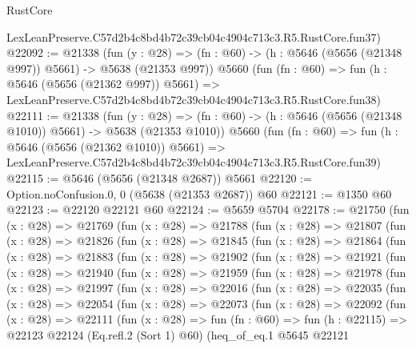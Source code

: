 \begin{lexlean}{RustCore}
\begin{coremodule}
    LexLeanPreserve.C57d2b4c8bd4b72c39cb04c4904c713c3.R5.RustCore.fun37)
@22092 := @21338
    (fun (y : @28) => (fn : @60) -> (h : @5646 (@5656 (@21348 @997)) @5661) -> @5638 (@21353 @997))
    @5660
    (fun (fn : @60) =>
    fun (h : @5646 (@5656 (@21362 @997)) @5661) =>
    LexLeanPreserve.C57d2b4c8bd4b72c39cb04c4904c713c3.R5.RustCore.fun38)
@22111 := @21338
    (fun (y : @28) =>
    (fn : @60) -> (h : @5646 (@5656 (@21348 @1010)) @5661) -> @5638 (@21353 @1010))
    @5660
    (fun (fn : @60) =>
    fun (h : @5646 (@5656 (@21362 @1010)) @5661) =>
    LexLeanPreserve.C57d2b4c8bd4b72c39cb04c4904c713c3.R5.RustCore.fun39)
@22115 := @5646 (@5656 (@21348 @2687)) @5661
@22120 := Option.noConfusion.{0, 0} (@5638 (@21353 @2687)) @60
@22121 := @1350 @60
@22123 := @22120 @22121 @60
@22124 := @5659 @5704
@22178 := @21750
    (fun (x : @28) =>
    @21769
      (fun (x : @28) =>
      @21788
        (fun (x : @28) =>
        @21807
          (fun (x : @28) =>
          @21826
            (fun (x : @28) =>
            @21845
              (fun (x : @28) =>
              @21864
                (fun (x : @28) =>
                @21883
                  (fun (x : @28) =>
                  @21902
                    (fun (x : @28) =>
                    @21921
                      (fun (x : @28) =>
                      @21940
                        (fun (x : @28) =>
                        @21959
                          (fun (x : @28) =>
                          @21978
                            (fun (x : @28) =>
                            @21997
                              (fun (x : @28) =>
                              @22016
                                (fun (x : @28) =>
                                @22035
                                  (fun (x : @28) =>
                                  @22054
                                    (fun (x : @28) =>
                                    @22073
                                      (fun (x : @28) =>
                                      @22092
                                        (fun (x : @28) =>
                                        @22111
                                          (fun (x : @28) =>
                                          fun (fn : @60) =>
                                          fun (h : @22115) =>
                                          @22123
                                            @22124
                                            (Eq.refl.{2} (Sort 1) @60)
                                            (heq_of_eq.{1}
                                              @5645
                                              @22121

\end{coremodule}
\end{lexlean}
